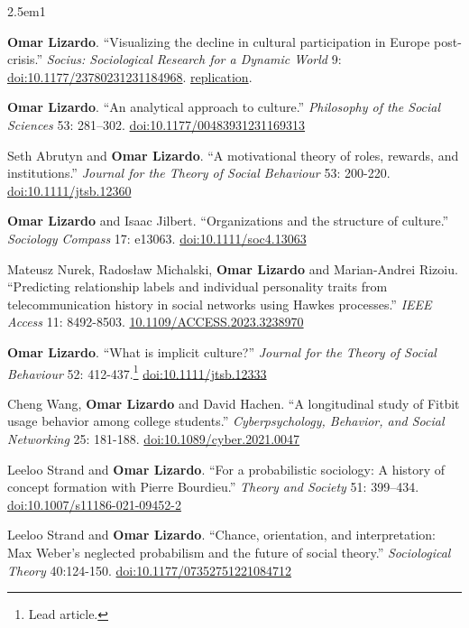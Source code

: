 \documentclass[
]{article}
\newenvironment{cventry}{\begin{hangparas}{2.5em}{1}}{\end{hangparas}}
\begin{document}
\begin{cventry}

\textbf{Omar Lizardo}. ``Visualizing the decline in cultural
participation in Europe post-crisis.'' \emph{Socius: Sociological
Research for a Dynamic World} 9:
\href{https://doi.org/10.1177/23780231231184968}{doi:10.1177/23780231231184968}.
\href{https://github.com/olizardo/Visualizing-the-Decline-in-Cultural-Participation-in-Europe-Post-Crisis}{
replication}.

\textbf{Omar Lizardo}. ``An analytical approach to culture.''
\emph{Philosophy of the Social Sciences} 53: 281--302.
\href{https://doi.org/10.1177/00483931231169313}{doi:10.1177/00483931231169313}

Seth Abrutyn and \textbf{Omar Lizardo}. ``A motivational theory of
roles, rewards, and institutions.'' \emph{Journal for the Theory of
Social Behaviour} 53: 200-220.
\href{https://doi.org/10.1111/jtsb.12360}{doi:10.1111/jtsb.12360}

\textbf{Omar Lizardo} and Isaac Jilbert. ``Organizations and the
structure of culture.'' \emph{Sociology Compass} 17: e13063.
\href{https://doi.org/10.1111/soc4.13063}{doi:10.1111/soc4.13063}

Mateusz Nurek, Radosław Michalski, \textbf{Omar Lizardo} and
Marian-Andrei Rizoiu. ``Predicting relationship labels and individual
personality traits from telecommunication history in social networks
using Hawkes processes.'' \emph{IEEE Access} 11: 8492-8503.
\href{https://doi.org/10.1109/ACCESS.2023.3238970}{10.1109/ACCESS.2023.3238970}

\textbf{Omar Lizardo}. ``What is implicit culture?'' \emph{Journal for
the Theory of Social Behaviour} 52: 412-437.\footnote{Lead article.}
\href{https://doi.org/10.1111/jtsb.12333}{doi:10.1111/jtsb.12333}

Cheng Wang, \textbf{Omar Lizardo} and David Hachen. ``A longitudinal
study of Fitbit usage behavior among college students.''
\emph{Cyberpsychology, Behavior, and Social Networking} 25: 181-188.
\href{https://doi.org/10.1089/cyber.2021.0047}{doi:10.1089/cyber.2021.0047}

Leeloo Strand and \textbf{Omar Lizardo}. ``For a probabilistic
sociology: A history of concept formation with Pierre Bourdieu.''
\emph{Theory and Society} 51: 399--434.
\href{https://doi.org/10.1007/s11186-021-09452-2}{doi:10.1007/s11186-021-09452-2}

Leeloo Strand and \textbf{Omar Lizardo}. ``Chance, orientation, and
interpretation: Max Weber's neglected probabilism and the future of
social theory.'' \emph{Sociological Theory} 40:124-150.
\href{https://doi.org/10.1177/07352751221084712}{doi:10.1177/07352751221084712}


\end{cventry}
\end{document}
